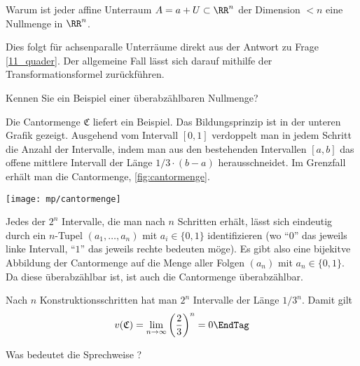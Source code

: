 \begin{frage}
  Warum ist jeder affine Unterraum $A=a+U\subset \RR^n$ 
  der Dimension $<n$ eine Nullmenge in $\RR^n$.
\end{frage}

\begin{antwort}
  Dies folgt für achsenparalle Unterräume direkt aus der Antwort 
  zu Frage \ref{11_quader}. Der allgemeine Fall lässt sich darauf 
  mithilfe der Transformationsformel zurückführen.
  \AntEnd
\end{antwort}

\begin{frage}
  Kennen Sie ein Beispiel einer überabzählbaren Nullmenge?
\end{frage}

\begin{antwort}
  Die Cantormenge $\mathfrak{C}$ liefert ein Beispiel. 
  Das Bildungsprinzip ist in der unteren Grafik gezeigt. 
  Ausgehend vom Intervall $[0,1]$ verdoppelt man in jedem Schritt die 
  Anzahl der Intervalle, indem man aus den bestehenden Intervallen $[a,b]$ 
  das offene mittlere Intervall der Länge $1/3\cdot(b-a)$ 
  herausschneidet. Im Grenzfall erhält man die Cantormenge, 
  \sieheAbbildung \ref{fig:cantormenge}.

  \begin{center}
    \texttt{[image: mp/cantormenge]}
    \label{fig:cantormenge}
  \end{center}

  \noindent%
  Jedes der $2^n$ Intervalle, die man nach $n$ Schritten erhält, 
  lässt sich eindeutig durch ein $n$-Tupel $(a_1, \ldots, a_n)$ mit 
  $a_i \in \{0,1\}$ identifizieren 
  (wo "`$0$"' das jeweils linke Intervall, "`$1$"' das jeweils rechte bedeuten möge). 
  Es gibt also eine bijekitve Abbildung der Cantormenge 
  auf die Menge aller Folgen $(a_n)$ mit $a_n \in \{0,1\}$. Da diese überabzählbar ist, 
  ist auch die Cantormenge überabzählbar.  
  
  Nach $n$ Konstruktionsschritten hat man $2^n$ Intervalle der Länge $1/3^n$. 
  Damit gilt 
  \[
  v( \mathfrak{C} ) = \lim_{n \to \infty} \left( \frac{2}{3} \right)^n =0 \EndTag
  \]
\end{antwort}


\begin{frage}
  Was bedeutet die Sprechweise ? 
\end{frage}

